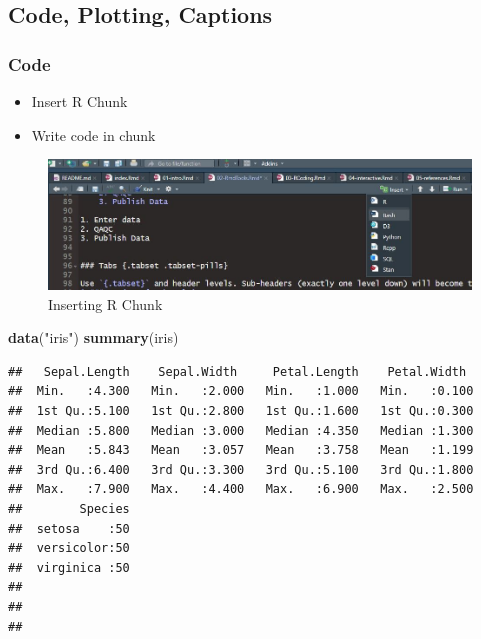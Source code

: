 \documentclass[
]{book}
\newenvironment{Shaded}{\begin{snugshade}}{\end{snugshade}}
\newcommand{\KeywordTok}[1]{\textcolor[rgb]{0.13,0.29,0.53}{\textbf{#1}}}
\newcommand{\NormalTok}[1]{#1}
\newcommand{\StringTok}[1]{\textcolor[rgb]{0.31,0.60,0.02}{#1}}
\providecommand{\tightlist}{%
  \setlength{\itemsep}{0pt}\setlength{\parskip}{0pt}}
\begin{document}
\hypertarget{code-plotting-captions}{%
\subsection{Code, Plotting, Captions}\label{code-plotting-captions}}

\hypertarget{code}{%
\subsubsection{Code}\label{code}}

\begin{itemize}
\tightlist
\item
  Insert R Chunk\\
\item
  Write code in chunk
\end{itemize}

\begin{figure}
\centering
\includegraphics{Rchunk.jpg}
\caption{Inserting R Chunk}
\end{figure}

\begin{Shaded}
\begin{Highlighting}[]
\KeywordTok{data}\NormalTok{(}\StringTok{"iris"}\NormalTok{)}
\KeywordTok{summary}\NormalTok{(iris)}
\end{Highlighting}
\end{Shaded}

\begin{verbatim}
##   Sepal.Length    Sepal.Width     Petal.Length    Petal.Width   
##  Min.   :4.300   Min.   :2.000   Min.   :1.000   Min.   :0.100  
##  1st Qu.:5.100   1st Qu.:2.800   1st Qu.:1.600   1st Qu.:0.300  
##  Median :5.800   Median :3.000   Median :4.350   Median :1.300  
##  Mean   :5.843   Mean   :3.057   Mean   :3.758   Mean   :1.199  
##  3rd Qu.:6.400   3rd Qu.:3.300   3rd Qu.:5.100   3rd Qu.:1.800  
##  Max.   :7.900   Max.   :4.400   Max.   :6.900   Max.   :2.500  
##        Species  
##  setosa    :50  
##  versicolor:50  
##  virginica :50  
##                 
##                 
## 
\end{verbatim}
\end{document}
